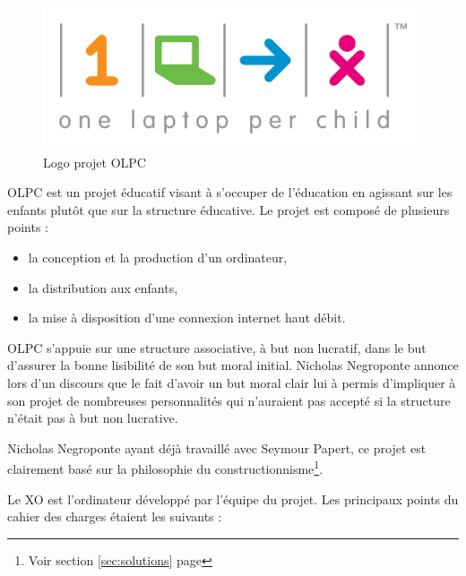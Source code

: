 \begin{figure}[H]
  \centering
  \includegraphics[width=.5\textwidth]{../resources/illustrations/OLPC_logo}
  \caption{Logo projet OLPC}
\end{figure}

OLPC est un projet éducatif visant à s'occuper de l'éducation en agissant sur les enfants plutôt que sur la structure éducative. Le projet est composé de plusieurs points : 



\begin{itemize}
  \item la conception et la production d'un ordinateur,
  \item la distribution aux enfants,
  \item la mise à disposition d'une connexion internet haut débit.
\end{itemize}

OLPC s'appuie sur une structure associative, à but non lucratif, dans le but d'assurer la bonne lisibilité de son but moral initial. Nicholas Negroponte annonce lors d'un discours \cite{ted_olpc_2008} que le fait d'avoir un but moral clair lui à permis d'impliquer à son projet de nombreuses personnalités qui n'auraient pas accepté si la structure n'était pas à but non lucrative.

Nicholas Negroponte ayant déjà travaillé avec Seymour Papert, ce projet est clairement basé sur la philosophie du constructionnisme\footnote{Voir section \ref{sec:solutions} page \pageref{sec:solutions}}.

Le XO est l'ordinateur développé par l'équipe du projet. Les principaux points du cahier des charges étaient les suivants : 

